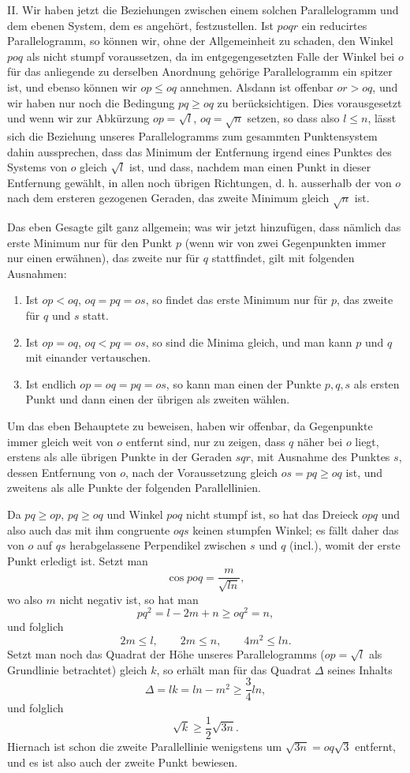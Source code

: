 \documentclass[11pt]{article}
\newcommand{\ord}[1]{#1$^{\circ}$}
\begin{document}
II. Wir haben jetzt die Beziehungen zwischen einem solchen Parallelogramm und dem ebenen System, dem es angehört, festzustellen. Ist $poqr$ ein reducirtes Parallelogramm, so können wir, ohne der Allgemeinheit zu schaden, den Winkel $poq$ als nicht stumpf voraussetzen, da im entgegengesetzten Falle der Winkel bei $o$ für das anliegende zu derselben Anordnung gehörige Parallelogramm ein spitzer ist, und ebenso können wir $op\le oq$ annehmen. Alsdann ist offenbar $or>oq$, und wir haben nur noch die Bedingung $pq\ge oq$ zu berücksichtigen. Dies vorausgesetzt und wenn wir zur Abkürzung $op=\sqrt l$, $oq=\sqrt n$ setzen, so dass also $l\le n$, lässt sich die Beziehung unseres Parallelogramms zum gesammten Punktensystem dahin aussprechen, dass das Minimum der Entfernung irgend eines Punktes des Systems von $o$ gleich $\sqrt l$ ist, und dass, nachdem man einen Punkt in dieser Entfernung gewählt, in allen noch übrigen Richtungen, d. h. ausserhalb der von $o$ nach dem ersteren gezogenen Geraden, das zweite Minimum gleich $\sqrt n$ ist.

Das eben Gesagte gilt ganz allgemein; was wir jetzt hinzufügen, dass nämlich das erste Minimum nur für den Punkt $p$ (wenn wir von zwei Gegenpunkten immer nur einen erwähnen), das zweite nur für $q$ stattfindet, gilt mit folgenden Ausnahmen:
\begin{enumerate}
\item[\ord{1}.] Ist $op<oq$, $oq=pq=os$, so findet das erste Minimum nur für $p$, das zweite für $q$ und $s$ statt.
\item[\ord{2}.] Ist $op=oq$, $oq<pq=os$, so sind die Minima gleich, und man kann $p$ und $q$ mit einander vertauschen.
\item[\ord{3}.] Ist endlich $op=oq=pq=os$, so kann man einen der Punkte $p,q,s$ als ersten Punkt und dann einen der übrigen als zweiten wählen.
\end{enumerate}

Um das eben Behauptete zu beweisen, haben wir offenbar, da Gegenpunkte immer gleich weit von $o$ entfernt sind, nur zu zeigen, dass $q$ näher bei $o$ liegt, erstens als alle übrigen Punkte in der Geraden $sqr$, mit Ausnahme des Punktes $s$, dessen Entfernung von $o$, nach der Voraussetzung gleich $os=pq\ge oq$ ist, und zweitens als alle Punkte der folgenden Parallellinien.

Da $pq\ge op$, $pq\ge oq$ und Winkel $poq$ nicht stumpf ist, so hat das Dreieck $opq$ und also auch das mit ihm congruente $oqs$ keinen stumpfen Winkel; es fällt daher das von $o$ auf $qs$ herabgelassene Perpendikel zwischen $s$ und $q$ (incl.), womit der erste Punkt erledigt ist. Setzt man
\[
 \cos poq=\frac{m}{\sqrt{ln}},
\]
wo also $m$ nicht negativ ist, so hat man
\[
 pq^2=l-2m+n\ge oq^2=n,
\]
und folglich
\[
 2m\le l,
\qquad 2m\le n,
\qquad 4m^2\le ln.
\]
Setzt man noch das Quadrat der Höhe unseres Parallelogramms ($op=\sqrt l$ als Grundlinie betrachtet) gleich $k$, so erhält man für das Quadrat $\Delta$ seines Inhalts
\[
 \Delta=lk=ln-m^2\ge \frac34 ln,
\]
und folglich
\[
 \sqrt{k}\ge \frac12\sqrt{3n}.
\]
Hiernach ist schon die zweite Parallellinie wenigstens um $\sqrt{3n}=oq\sqrt3$ entfernt, und es ist also auch der zweite Punkt bewiesen.
\end{document}
